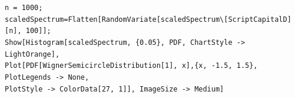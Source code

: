 \documentclass[letter,11pt]{article}
\begin{document}
\vspace{3mm} 
\begin{mdframed}[backgroundcolor=magenta!3]
	\begin{footnotesize} 
		\verb"n = 1000;"\\ 
		\verb"scaledSpectrum=Flatten[RandomVariate[scaledSpectrum\[ScriptCapitalD][n], 100]];"\\
		\verb"Show[Histogram[scaledSpectrum, {0.05}, PDF, ChartStyle -> LightOrange], "  \\ 
		\verb"Plot[PDF[WignerSemicircleDistribution[1], x],{x, -1.5, 1.5}, PlotLegends -> None, " \\
		\verb"PlotStyle -> ColorData[27, 1]], ImageSize -> Medium]"
	\end{footnotesize} 
\end{mdframed} 



\end{document}
